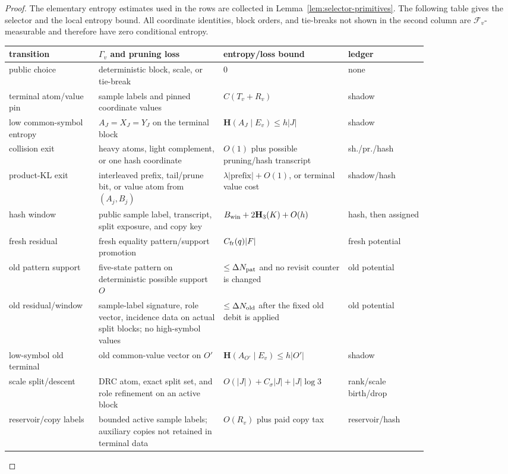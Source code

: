 \documentclass[11pt]{article}
\newcommand{\bfH}{\mathbf H}
\begin{document}
\begin{proof}
The elementary entropy estimates used in the rows are collected in
Lemma~\ref{lem:selector-primitives}.  The following table gives the selector
and the local entropy bound.  All
coordinate identities, block orders, and tie-breaks not shown in the second
column are $\mathcal F_v$-measurable and therefore have zero conditional
entropy.
\begin{center}
\scriptsize
\begin{tabular}{p{0.18\linewidth}p{0.25\linewidth}p{0.23\linewidth}p{0.16\linewidth}}
transition & $\Gamma_v$ and pruning loss & entropy/loss bound & ledger\\[1mm]
\hline
public choice &
deterministic block, scale, or tie-break &
0 &
none\\[1mm]
terminal atom/value pin &
sample labels and pinned coordinate values &
$C(T_v+R_v)$ &
shadow\\[1mm]
low common-symbol entropy &
$A_J=X_J=Y_J$ on the terminal block &
$\bfH(A_J\mid E_v)\le h|J|$ &
shadow\\[1mm]
collision exit &
heavy atoms, light complement, or one hash coordinate &
$O(1)$ plus possible pruning/hash transcript &
sh./pr./hash\\[1mm]
product-KL exit &
interleaved prefix, tail/prune bit, or value atom from $(A_j,B_j)$ &
$\lambda|\text{prefix}|+O(1)$, or terminal value cost &
shadow/hash\\[1mm]
hash window &
public sample label, transcript, split exposure, and copy key &
$B_{\rm win}+2\bfH_3(K)+O(h)$ &
hash, then assigned\\[1mm]
fresh residual &
fresh equality pattern/support promotion &
$C_{\rm fr}(q)|F|$ &
fresh potential\\[1mm]
old pattern support &
five-state pattern on deterministic possible support $O$ &
$\le \Delta N_{\rm pat}$ and no revisit counter is changed &
old potential\\[1mm]
old residual/window &
sample-label signature, role vector, incidence data on actual split blocks; no
high-symbol values &
$\le \Delta N_{\rm old}$ after the fixed old debit is applied &
old potential\\[1mm]
low-symbol old terminal &
old common-value vector on $O'$ &
$\bfH(A_{O'}\mid E_v)\le h|O'|$ &
shadow\\[1mm]
scale split/descent &
DRC atom, exact split set, and role refinement on an active block &
$O(|J|)+C_\sigma |J|+|J|\log 3$ &
rank/scale birth/drop\\[1mm]
reservoir/copy labels &
bounded active sample labels; auxiliary copies not retained in terminal data &
$O(R_v)$ plus paid copy tax &
reservoir/hash
\end{tabular}
\end{center}


\end{proof}
\end{document}
